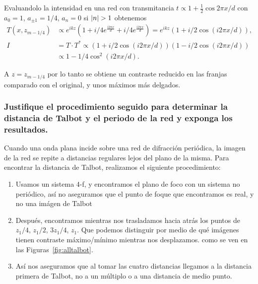 \documentclass{./packages/optica-article}
\begin{document}
	      Evaluandolo la intensidad en una red con transmitancia $t \propto 1 + \frac{1}{2}\cos{2\pi x / d}$  con $a_0=1$, $a_{\pm 1}=1/4$, $a_n = 0$ si $\abs{n} > 1$
	      obtenemos
	      \nopagebreak
	      \begin{align*}
		      T(x,z_{m-1/4}) & \propto
		      e^{ikz}\left(
		      1
		      +i/4 e^{\frac{i 2 \pi  x} {d}}
		      +i/4 e^{\frac{i 2 \pi  x} {d}}
		      \right) = e^{ikz}
		      \left(
		      1
		      +i/2 \cos(i 2 \pi  x /d)
		      \right)
		      ,                                              \\
		      I              &=  T \cdot T^{*} \propto
		      \left(
		      1
		      +i/2 \cos(i 2 \pi  x /d)
		      \right)
		      \left(
		      1
		      -i/2 \cos(i 2 \pi  x /d)
		      \right) \\
		      &\propto
		      1 - 1/4 \cos^{2}(i 2 \pi  x /d).
	      \end{align*}

	      A $z = z_{m - 1/4}$ por lo tanto se obtiene un contraste reducido en las franjas comparado con el original, y unos máximos más delgados.



\subsubsection{ Justifique el procedimiento seguido para determinar la distancia de Talbot y el periodo de la red y exponga los resultados.}
	      Cuando una onda plana incide sobre una red de difracción periódica, la imagen de la red se repite a distancias regulares lejos del plano de la misma. Para encontrar la distancia de Talbot, realizamos el siguiente procedimiento:
	      
\begin{enumerate}
	    \item Usamos un sistema 4-f, y encontramos el plano de foco con un sistema no periódico, así no aseguramos que el punto de foque que encontramos es real, y no una imágen de Talbot
		\item Después, encontramos mientras nos trasladamos hacia atrás los puntos de $z_{1}/4$, $z_{1}/2$, $3 z_{1}/4$, $z_{1}$. Que podemos distinguir por medio de qué imágenes tienen contraste máximo/mínimo mientras nos desplazamos. como se ven en las Figuras~\ref{fig:alltalbot}.
		\item Así nos aseguramos que al tomar las cuatro distancias llegamos a la distancia primera de Talbot, no a un múltiplo o a una distancia de medio punto.
\end{enumerate}
\end{document}
